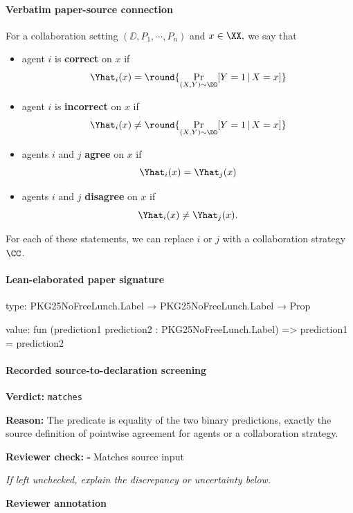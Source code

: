 \documentclass[10pt]{article}
\newcommand{\reviewerbox}{%
  \par\noindent\fbox{\parbox{0.96\linewidth}{\rule{0pt}{0.38in}}}\par
}
\newcommand{\reviewmatch}[1]{%
  \par\noindent\textbf{Reviewer check:} $\square$\; #1\par
  \noindent\emph{If left unchecked, explain the discrepancy or uncertainty below.}\par
}
\begin{document}
\paragraph{Verbatim paper-source connection}
\begin{ReviewVerbatim}
\begin{definition}\label{def:correct}
For a collaboration setting $(\DD, P_1,\cdots,P_n)$ and $x\in \XX,$ we say that
\begin{itemize}
    \item agent $i$ is \textbf{correct} on $x$ if $$\Yhat_i(x) = \round{\Pr_{(X,Y)\sim \DD}[Y=1\,|\,X=x]}$$
    \item agent $i$ is \textbf{incorrect} on $x$ if $$\Yhat_i(x) \neq \round{\Pr_{(X,Y)\sim \DD}[Y=1\,|\,X=x]}$$
    \item agents $i$ and $j$ \textbf{agree} on $x$ if $$\Yhat_i(x) = \Yhat_j(x)$$
    \item agents $i$ and $j$ \textbf{disagree} on $x$ if $$\Yhat_i(x) \neq \Yhat_j(x).$$
\end{itemize}
For each of these statements, we can replace $i$ or $j$ with a collaboration strategy $\CC$.
\end{definition}
\end{ReviewVerbatim}



\paragraph{Lean-elaborated paper signature}
\begin{ReviewVerbatim}
type:
PKG25NoFreeLunch.Label → PKG25NoFreeLunch.Label → Prop

value:
fun (prediction1 prediction2 : PKG25NoFreeLunch.Label) => prediction1 = prediction2
\end{ReviewVerbatim}


\paragraph{Recorded source-to-declaration screening}
\textbf{Verdict:} \texttt{matches}
\\
{\raggedright
\textbf{Reason:} The predicate is equality of the two binary predictions, exactly the source definition of pointwise agreement for agents or a collaboration strategy.\allowbreak{}
\par}
\reviewmatch{Matches source input}
\noindent\textbf{Reviewer annotation}\par
\reviewerbox
\clearpage
\hypertarget{paper-prerequisite-25b6f16dda3c73b9}{}
\end{document}

